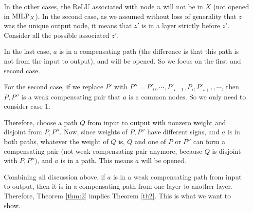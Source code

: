 			In the other cases, the ReLU associated with node $n$ will not be in $X$ 
			(not opened in ${\textrm{MILP}}_X$).
			In the second case, as we assumed without loss of generality that $z$ was the unique output node, it means that $z'$ is in a layer strictly before $z'$.
			Consider all the possible associated $z'$.


			In the last case, $a$ is in a compensating path (the difference is that this path is not from the input to output), and will be opened. So we focus on the first and second case.
			
			For the second case, if we replace $P'$ with $P''=P'_0,\cdots,P'_{i-1},P_{i},P'_{i+1},\cdots$, then $P,P''$ is a weak compensating pair that $a$ is a common nodes. So we only need to consider case 1.
			
			Therefore, choose a path $Q$ from input to output with nonzero weight and disjoint from $P,P''$. Now, since weights of $P,P''$ have different signs, and $a$ is in both paths, whatever the weight of $Q$ is, $Q$ and one of  $P$ or $P''$ can form a compensating pair (not weak compensating pair anymore, because $Q$ is disjoint with $P,P''$), and $a$ is in a path. This means $a$ will be opened.
			
			Combining all discussion above, if $a$ is in a weak compensating path from input to output, then it is in a compensating path from one layer to another layer. Therefore, Theorem \ref{thm:2} implies Theorem \ref{th2}. This is what we want to show.
			
 			
		